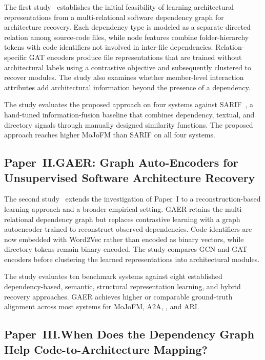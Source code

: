 The first study~\cite{arl_2026} establishes the initial feasibility of learning architectural representations from a multi-relational software dependency graph for architecture recovery. Each dependency type is modeled as a separate directed relation among source-code files, while node features combine folder-hierarchy tokens with code identifiers not involved in inter-file dependencies. Relation-specific GAT encoders produce file representations that are trained without architectural labels using a contrastive objective and subsequently clustered to recover modules. The study also examines whether member-level interaction attributes add architectural information beyond the presence of a dependency.
 
The study evaluates the proposed approach on four systems against SARIF~\cite{sarif}, a hand-tuned information-fusion baseline that combines dependency, textual, and directory signals through manually designed similarity functions. The proposed approach reaches higher MoJoFM than SARIF on all four systems.

\subsection[Paper~II: Software Architecture Recovery]{Paper~II.\quad GAER: Graph Auto-Encoders for Unsupervised Software Architecture Recovery}
\label{sec:overview-gaer}

The second study~\cite{gaer} extends the investigation of Paper~I to a reconstruction-based learning approach and a broader empirical setting. GAER retains the multi-relational dependency graph but replaces contrastive learning with a graph autoencoder trained to reconstruct observed dependencies. Code identifiers are now embedded with Word2Vec rather than encoded as binary vectors, while directory tokens remain binary-encoded. The study compares GCN and GAT encoders before clustering the learned representations into architectural modules.
 
The study evaluates ten benchmark systems against eight established dependency-based, semantic, structural representation learning, and hybrid recovery approaches. GAER achieves higher or comparable ground-truth alignment across most systems for MoJoFM, A2A, \cc{}, and ARI.

\subsection[Paper~III: Code-to-Architecture Mapping]{Paper~III.\quad When Does the Dependency Graph Help Code-to-Architecture Mapping?}
\label{sec:overview-c2a}

